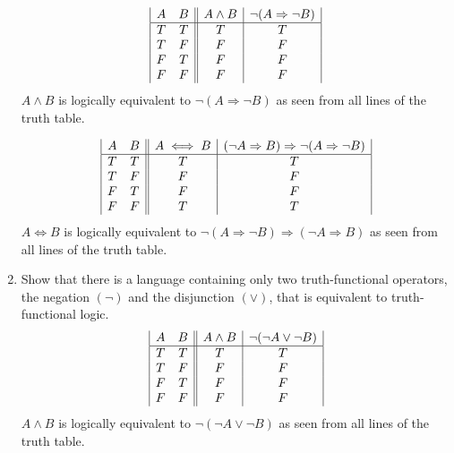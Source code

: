 \documentclass[]{article}
\begin{document}
\begin{enumerate}
    \begin{displaymath}
    \begin{array}{|c c ||c|c|}
    A & B & A \land B & \neg(A \Rightarrow \neg  B)\\
    \hline
    T & T & T & T\\
    T & F & F & F\\
    F & T & F & F\\
    F & F & F & F\\
    \end{array}
    \end{displaymath}
    \newline $A \land B$ is logically equivalent to $\neg (A \Rightarrow \neg B)$ as seen from all lines of the truth table.
    
    \begin{displaymath}
    \begin{array}{|c c ||c|c|}
    A & B & A \iff B & (\neg A \Rightarrow B) \Rightarrow \neg(A \Rightarrow \neg B) \\
    \hline
    T & T & T & T\\
    T & F & F & F\\
    F & T & F & F\\
    F & F & T & T\\
    \end{array}
    \end{displaymath}
    \newline $A \iff B$ is logically equivalent to $\neg(A \Rightarrow \neg B)\Rightarrow (\neg A \Rightarrow B)$ as seen from all lines of the truth table.
    
    \item Show that there is a language containing only two truth-functional operators, the negation $(\neg)$ and the disjunction $(\lor)$, that is equivalent to truth-functional logic.
    \begin{displaymath}
    \begin{array}{|c c ||c|c|}
    A & B & A \land B & \neg(\neg A \lor \neg B)\\
    \hline
    T & T & T & T\\
    T & F & F & F\\
    F & T & F & F\\
    F & F & F & F\\
    \end{array}
    \end{displaymath}
    \newline $A \land B$ is logically equivalent to $\neg(\neg A \lor \neg B)$ as seen from all lines of the truth table.
   

\end{enumerate}
\end{document}
